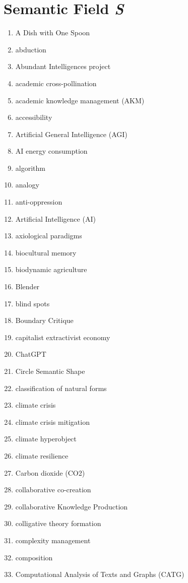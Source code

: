 \clearpage

\section{Semantic Field \textit{S}}

\begin{multicols}{4}
\begin{enumerate}[label=\arabic*.]
\item A Dish with One Spoon
\item abduction
\item Abundant Intelligences project
\item academic cross-pollination
\item academic knowledge management (AKM)
\item accessibility
\item Artificial General Intelligence (AGI)
\item AI energy consumption
\item algorithm
\item analogy
\item anti-oppression
\item Artificial Intelligence (AI)
\item axiological paradigms
\item biocultural memory
\item biodynamic agriculture
\item Blender
\item blind spots
\item Boundary Critique
\item capitalist extractivist economy
\item ChatGPT
\item Circle Semantic Shape
\item classification of natural forms
\item climate crisis
\item climate crisis mitigation
\item climate hyperobject
\item climate resilience
\item Carbon dioxide (CO2)
\item collaborative co-creation
\item collaborative Knowledge Production
\item colligative theory formation
\item complexity management
\item composition
\item Computational Analysis of Texts and Graphs (CATG)

\end{enumerate}
\end{multicols}
